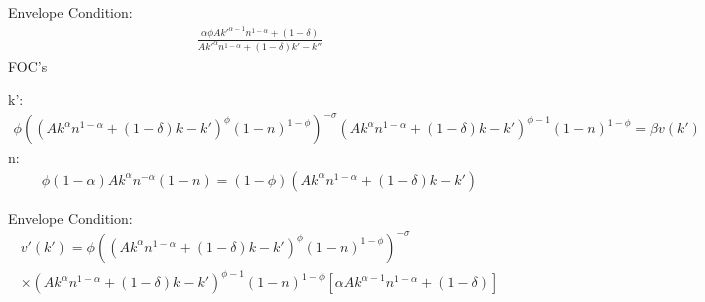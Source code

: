 \documentclass[10pt, a4paper]{article}
\begin{document}
    Envelope Condition:
    \begin{gather*}
      \frac{\alpha\phi Ak'^{\alpha-1}n^{1-\alpha}+(1-\delta)}{Ak'^{\alpha}n^{1-\alpha}+(1-\delta)k'-k''}
    \end{gather*}
    FOC's
    
    k':
    \begin{gather*}
      \phi((Ak^{\alpha}n^{1-\alpha}+(1-\delta)k-k')^{\phi}(1-n)^{1-\phi})^{-\sigma} (Ak^{\alpha}n^{1-\alpha}+(1-\delta)k-k')^{\phi-1}(1-n)^{1-\phi} = \beta v(k')
    \end{gather*}
    n:
    \begin{gather*}
      \phi(1-\alpha)Ak^{\alpha}n^{-\alpha}(1-n)=(1-\phi)(Ak^{\alpha}n^{1-\alpha}+(1-\delta)k-k')
    \end{gather*}

    Envelope Condition:
    \begin{gather*}
      v'(k') = \phi ((Ak^\alpha n^{1-\alpha} + (1-\delta)k - k')^\phi (1-n)^{1-\phi})^{-\sigma}\\ \times(Ak^\alpha n^{1-\alpha} + (1-\delta)k - k')^{\phi-1} (1-n)^{1-\phi} [\alpha Ak^{\alpha-1}n^{1-\alpha} + (1-\delta)]
    \end{gather*}
\end{document}
